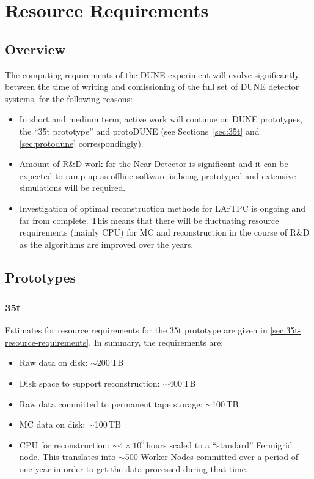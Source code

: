 \section{Resource Requirements}
\subsection{Overview}
The computing requirements of the DUNE experiment will evolve significantly between the time of writing
and comissioning of the full set of DUNE detector systems, for the following reasons:
\begin{itemize}
\item In short and medium term, active work will continue on DUNE prototypes, the ``35t prototype'' and protoDUNE
(see Sections~\ref{sec:35t} and \ref{sec:protodune} correspondingly).

\item Amount of R\&D work for the Near Detector is significant and it can be expected to ramp up as offline software
is being prototyped and extensive simulations will be required.

\item Investigation of optimal reconstruction methods for LArTPC is ongoing and far from complete. This means
that there will be fluctuating resource requirements (mainly CPU) for MC and reconstruction in the course of R\&D
as the algorithms are improved over the years.


\end{itemize}

\subsection{Prototypes}
\subsubsection{35t}
Estimates for resource requirements for the 35t prototype are given in \ref{sec:35t-resource-requirements}.
In summary, the requirements are:
\begin{itemize}

\item Raw data on disk: $\sim$200\,TB

\item Disk space to support reconstruction: $\sim$400\,TB

\item Raw data committed to permanent tape storage: $\sim$100\,TB

\item MC data on disk: $\sim$100\,TB

\item CPU for reconstruction: $\sim4\times10^6$\,hours scaled to a ``standard'' Fermigrid node. This translates into $\sim$500 Worker Nodes
committed over a period of one year in order to get the data processed during that time.

\end{itemize}

